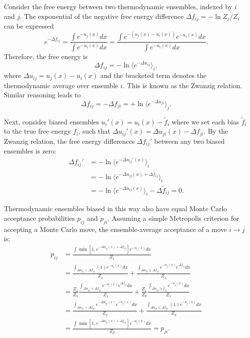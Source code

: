 \documentclass[%
 aip,
 rsi,
 jmp,%
 amsmath,amssymb,
 reprint,%
]{revtex4-1}
\begin{document}
Consider the free energy between two thermodynamic ensembles, indexed by $i$ and $j$.  The exponential of the negative free energy difference $\Delta f_{ij} = -\ln Z_j/Z_i$ can be expressed
\begin{equation}
      e^{-\Delta f_{ij}} = \frac{\int e^{-u_j(x)} dx}{\int e^{-u_i(x)} dx}  
            = \frac{\int e^{-(u_j(x)-u_i(x))}e^{-u_i(x)} dx}{\int e^{-u_i(x)} dx}.
\end{equation}
Therefore, the free energy is
\begin{equation}
    \Delta f_{ij} = - \ln \langle e^{-\Delta u_{ij}} \rangle_i,
\end{equation}
where $\Delta u_{ij} = u_j(x)-u_i(x)$ and the bracketed term denotes the thermodynamic average over ensemble $i$. This is known as the Zwanzig relation.\cite{zwanzig1954high} Similar reasoning leads to 
\begin{equation}
    \Delta f_{ij} = -\Delta f_{ji} =  + \ln \langle e^{-\Delta u_{ji}} \rangle_j.
\end{equation}

Next, consider biased ensembles $u_i'(x) = u_i(x) - \tilde{f}_i$ where we set each bias $\tilde{f}_i$ to the true free energy $f_i$, such that $\Delta u_{ij}'(x) = \Delta u_{ji}(x) - \Delta f_{ji}$.  By the Zwanzig relation, the free energy differences $\Delta f_{ij}'$ between any two biased ensembles is zero:
\begin{align}
    \Delta f_{ij}' &= - \ln \langle e^{-\Delta u_{ij}'(x)} \rangle_i \\
    &= - \ln \langle e^{-\Delta u_{ij}(x)  + \Delta \tilde{f}_{ij} } \rangle_i \\
    &= - \ln \langle e^{-\Delta u_{ij}(x)}\rangle_i - \Delta \tilde{f}_{ij}  = 0.
\end{align}

Thermodynamic ensembles biased in this way also have equal Monte Carlo acceptance probabilities $p_{ij}$ and $p_{ji}$.  Assuming a simple Metropolis criterion for accepting a Monte Carlo move, the ensemble-average acceptance of a move $i \rightarrow j$ is:
\begin{align}
    p_{ij} &= \frac{ \int \min [ 1, e^{-\Delta u_{ij}(x) + \Delta f_{ij} } ] e^{-u_i(x)} dx} {Z_1} \\
    &= \frac{\int_{\Delta u_{ij} < \Delta f_{ij} } (1) e^{-u_i(x)} dx}{Z_1} + \frac{\int_{\Delta u_{ij} \geq \Delta f_{ij} } e^{-u_j(x)} e^{\Delta f_{ij}} dx}{Z_1} \\
    &=  \frac{Z_1}{Z_2} \frac{\int_{\Delta u_{ji} > \Delta f_{ji} } e^{-u_i(x)} e^{\Delta f_{ji}} dx}{Z_1} + \frac{Z_1}{Z_2} \frac{\int_{\Delta u_{ij} \geq \tilde{f}_{ij} } e^{-u_j(x)} dx}{Z_1} \\
    &=  \frac{\int_{\Delta u_{ji} > \Delta f_{ji} } e^{-\Delta u_{ji}(x)} e^{-u_j(x)} dx}{Z_2} + \frac{\int_{\Delta u_{ji} \leq \Delta \tilde{f}_{ji} } (1) e^{-u_j(x)} dx}{Z_2} \\
    &= \frac{ \int \min [ 1, e^{-\Delta u_{ji}(x) + \Delta f_{ji} } ] e^{-u_j(x)} dx} {Z_2} = p_{ji}. 
\end{align}



\end{document}
